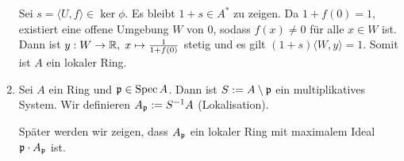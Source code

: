 \documentclass[12pt,a4paper]{scrartcl}
\theoremstyle{cplain}
\theoremstyle{cdef}
\begin{document}
\begin{bsp}
\begin{enumerate}
        Sei $s = \langle U,f \rangle \in \ker \phi$. Es bleibt $1+s \in A^*$ zu zeigen. Da $1+f(0)=1$, existiert eine offene Umgebung $W$ von $0$, sodass $f(x) \neq 0$ für alle $x \in W$ ist. Dann ist $y: W \to \mathbb R, \; x \mapsto \frac{1}{1+f(0)}$ stetig und es gilt $(1+s)\langle W,y \rangle = 1$. Somit ist $A$ ein lokaler Ring.
        
        \item Sei $A$ ein Ring und $\mathfrak{p} \in \operatorname{Spec} A$. Dann ist $S := A \setminus \mathfrak{p}$ ein multiplikatives System. Wir definieren $A_{\mathfrak{p}} := S^{-1}A$ (Lokalisation).
        
        Später werden wir zeigen, dass $A_{\mathfrak{p}}$ ein lokaler Ring mit maximalem Ideal $\mathfrak{p} \cdot A_{\mathfrak{p}}$ ist.
	\end{enumerate}
\end{bsp}

\end{document}
